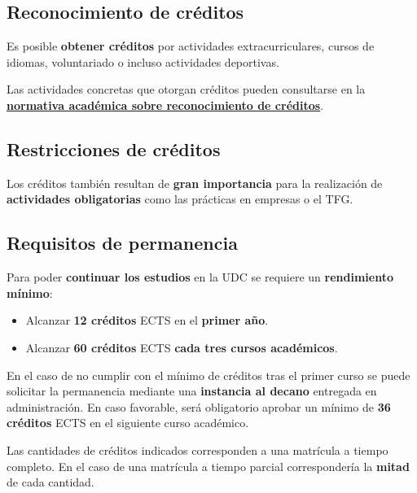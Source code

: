 \subsection{Reconocimiento de créditos}

Es posible \textbf{obtener créditos} por actividades extracurriculares, cursos de idiomas, voluntariado o incluso actividades deportivas.

\begin{infoBox}
    Las actividades concretas que otorgan créditos pueden consultarse en la \href{https://www.udc.es/gl/normativa/academica/}{\textbf{normativa académica sobre reconocimiento de créditos}}.
\end{infoBox}

\subsection{Restricciones de créditos}

Los créditos también resultan de \textbf{gran importancia} para la realización de \textbf{actividades obligatorias} como las prácticas en empresas o el \acrfull{TFG}.

\subsection{Requisitos de permanencia}

Para poder \textbf{continuar los estudios} en la \acrshort{UDC} se requiere un \textbf{rendimiento mínimo}:

\begin{itemize}
    \item Alcanzar \textbf{12 créditos} \acrshort{ECTS} en el \textbf{primer año}.

    \item Alcanzar \textbf{60 créditos} \acrshort{ECTS} \textbf{cada tres cursos académicos}.
\end{itemize}

\begin{warningBox}
    En el caso de no cumplir con el mínimo de créditos tras el primer curso se puede solicitar la permanencia mediante una \textbf{instancia al decano} entregada en administración. En caso favorable, será obligatorio aprobar un mínimo de \textbf{36 créditos} \acrshort{ECTS} en el siguiente curso académico.
\end{warningBox}

\begin{infoBox}
    Las cantidades de créditos indicados corresponden a una matrícula a tiempo completo. En el caso de una matrícula a tiempo parcial correspondería la \textbf{mitad} de cada cantidad.
\end{infoBox}

